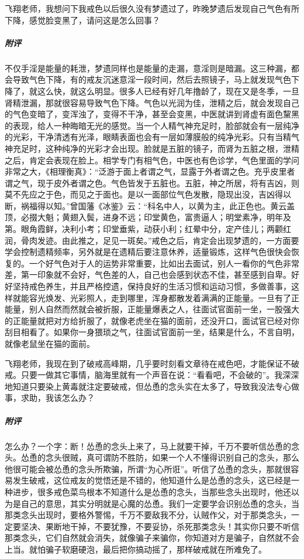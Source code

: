 \begin{case}
    飞翔老师，我想问下我戒色以后很久没有梦遗过了，昨晚梦遗后发现自己气色有所下降，感觉脸变黑了，请问这是怎么回事？
    \subparagraph{附评} 不仅手淫是能量的耗泄，梦遗同样也是能量的走漏，意淫则是暗漏。这三种漏，都会导致气色下降，有的戒友沉迷意淫一段时间，然后去照镜子，马上就发现气色下降了，就这么快，就这么明显。很多人已经有好几年撸龄了，现在又是冬季，一旦肾精泄漏，那就很容易导致气色下降。气色以光润为佳，泄精之后，就会发现自己的气色变暗了，变浑浊了，变得不干净，甚至会变黑，中医就讲到肾虚有面色黧黑的表现，给人一种晦暗无光的感觉。当一个人精气神充足时，脸部就会有一层纯净的光彩，干净清透有光泽，眼睛表面也会有一层如薄膜般的纯净光彩。只有当精气神充足时，这种纯净的光彩才会出现。脸就是五脏的镜子，而肾为五脏之根，泄精之后，肯定会表现在脸上。相学专门有相气色，中医也有色诊学，气色里面的学问非常之大，《相理衡真》：“泛游于面上者谓之气，显露于外者谓之色。充乎皮里者谓之气，现于皮外者谓之色。气色皆发于五脏也。五脏，神之所居，将有吉凶，则莫不先应之于色，而见之于面也。是以一面部位气色发散，隐现出没，吉凶得以断，祸福得以知。”曾国藩《冰鉴》云：“科名中人，以黄为主，此正色也。黄云盖顶，必掇大魁；黄翅入鬓，进身不远；印堂黄色，富贵逼人；明堂素净，明年及第。眼角霞鲜，决利小考；印堂垂紫，动获小利；红晕中分，定产佳儿；两颧红润，骨肉发迹。由此推之，足见一斑矣。”戒色之后，肯定会出现梦遗的，一方面要学会控制遗精频率，另外就是在遗精后要注意休养，适量锻炼，这样气色很快会恢复的。一个好气色对于人的运势非常重要，比如出去面试，别人一看你的气色非常差，第一印象就不会好，气色差的人，自己也会感到状态不佳，甚至感到自卑。好好坚持戒色养生，并且严格控遗，保持良好的生活习惯和运动习惯，多做善事，这样就能容光焕发、光彩照人，走到哪里，浑身都散发着满满的正能量。一旦有了正能量，别人自然而然就会被折服，正能量爆表之人，往面试官面前一坐，一股强大的正能量就把对方给折服了，就像老虎坐在猫的面前，还没开口，面试官已经对你刮目相看了。如果你一身猥琐之气，往面试官面前一坐，结果是什么，不言自明，就像老鼠坐在猫的面前。
\end{case}

\begin{case}
    飞翔老师，我现在到了破戒高峰期，几乎要时刻看文章待在戒色吧，才能保证不破戒。只要一做其它事情，脑海里就有一个声音在说：“看看吧，不会破的”。我深深地知道只要染上黄毒就注定要破戒，但怂恿的念头实在太多了，导致我没法专心做事，求助，我该怎么办？
    \subparagraph{附评} 怎么办？一个字：断！怂恿的念头上来了，马上就要干掉，千万不要听信怂恿的念头。怂恿的念头很贼，真可谓防不胜防，如果一个人不懂得识别自己的念头，那么他很可能会被怂恿的念头所欺骗，所谓“为心所诳”。听信了怂恿的念头，那就很容易发生破戒，这位戒友的觉悟还是不错的，他知道什么是怂恿的念头，这已经是一种进步，很多戒色菜鸟根本不知道什么是怂恿的念头，当那些念头出现时，他还以为是自己的意思，其实分明就是心魔的怂恿。我们一定要学会识别怂恿的念头，当那类念头出现时，要格外警惕，千万不要敌我不分，认贼作父，对于那类念头，一定要坚决、果断地干掉，不要犹豫，不要妥协，杀死那类念头！其实你只要不听信那类念头，它们自然就会消失，就像骗子来骗你，你知道对方是骗子，自然就不会上当。就怕骗子软磨硬泡，最后把你搞动摇了，那样破戒就在所难免了。
\end{case}

